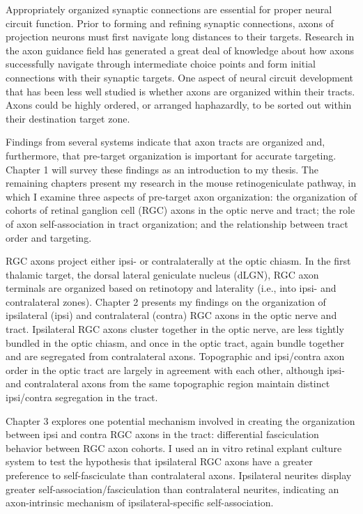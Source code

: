 Appropriately organized synaptic connections are essential for proper neural circuit function.
Prior to forming and refining synaptic connections, axons of projection neurons must first navigate long distances to their targets.
Research in the axon guidance field has generated a great deal of knowledge about how axons successfully navigate through intermediate choice points and form initial connections with their synaptic targets.
One aspect of neural circuit development that has been less well studied is whether axons are organized within their tracts.
Axons could be highly ordered, or arranged haphazardly, to be sorted out within their destination target zone.

Findings from several systems indicate that axon tracts are organized and, furthermore, that pre-target organization is important for accurate targeting.
Chapter 1 will survey these findings as an introduction to my thesis.
The remaining chapters present my research in the mouse retinogeniculate pathway, in which I examine three aspects of pre-target axon organization: the organization of cohorts of retinal ganglion cell (RGC) axons in the optic nerve and tract; the role of axon self-association in tract organization; and the relationship between tract order and targeting.

RGC axons project either ipsi- or contralaterally at the optic chiasm.
In the first thalamic target, the dorsal lateral geniculate nucleus (dLGN), RGC axon terminals are organized based on retinotopy and laterality (i.e., into ipsi- and contralateral zones).
Chapter 2 presents my findings on the organization of ipsilateral (ipsi) and contralateral (contra) RGC axons in the optic nerve and tract.
Ipsilateral RGC axons cluster together in the optic nerve, are less tightly bundled in the optic chiasm, and once in the optic tract, again bundle together and are segregated from contralateral axons.
Topographic and ipsi/contra axon order in the optic tract are largely in agreement with each other, although ipsi- and contralateral axons from the same topographic region maintain distinct ipsi/contra segregation in the tract.

Chapter 3 explores one potential mechanism involved in creating the organization between ipsi and contra RGC axons in the tract: differential fasciculation behavior between RGC axon cohorts.
I used an in vitro retinal explant culture system to test the hypothesis that ipsilateral RGC axons have a greater preference to self-fasciculate than contralateral axons.
Ipsilateral neurites display greater self-association/fasciculation than contralateral neurites, indicating an axon-intrinsic mechanism of ipsilateral-specific self-association. 


